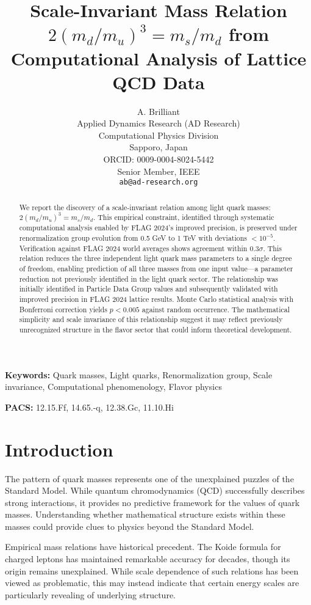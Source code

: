 \documentclass[12pt]{article}
\title{Scale-Invariant Mass Relation $2(m_d/m_u)^3 = m_s/m_d$ from Computational Analysis of Lattice QCD Data}
\author{A. Brilliant \\
\small Applied Dynamics Research (AD Research) \\
\small Computational Physics Division \\
\small Sapporo, Japan \\
\small ORCID: 0009-0004-8024-5442 \\
\small Senior Member, IEEE \\
\small \texttt{ab@ad-research.org}}
\date{}
\begin{document}
\pagestyle{plain}

\maketitle


\begin{abstract}
We report the discovery of a scale-invariant relation among light quark masses: $2(m_d/m_u)^3 = m_s/m_d$. This empirical constraint, identified through systematic computational analysis enabled by FLAG 2024's improved precision, is preserved under renormalization group evolution from 0.5 GeV to 1 TeV with deviations $<10^{-5}$. Verification against FLAG 2024 world averages shows agreement within $0.3\sigma$. This relation reduces the three independent light quark mass parameters to a single degree of freedom, enabling prediction of all three masses from one input value—a parameter reduction not previously identified in the light quark sector. The relationship was initially identified in Particle Data Group values and subsequently validated with improved precision in FLAG 2024 lattice results. Monte Carlo statistical analysis with Bonferroni correction yields $p < 0.005$ against random occurrence. The mathematical simplicity and scale invariance of this relationship suggest it may reflect previously unrecognized structure in the flavor sector that could inform theoretical development.
\end{abstract}

\textbf{Keywords:} Quark masses, Light quarks, Renormalization group, Scale invariance, Computational phenomenology, Flavor physics

\textbf{PACS:} 12.15.Ff, 14.65.-q, 12.38.Gc, 11.10.Hi

\section{Introduction}
\label{sec:intro}

The pattern of quark masses represents one of the unexplained puzzles of the Standard Model. While quantum chromodynamics (QCD) successfully describes strong interactions, it provides no predictive framework for the values of quark masses. Understanding whether mathematical structure exists within these masses could provide clues to physics beyond the Standard Model.

Empirical mass relations have historical precedent. The Koide formula for charged leptons has maintained remarkable accuracy for decades, though its origin remains unexplained. While scale dependence of such relations has been viewed as problematic, this may instead indicate that certain energy scales are particularly revealing of underlying structure.
\end{document}
